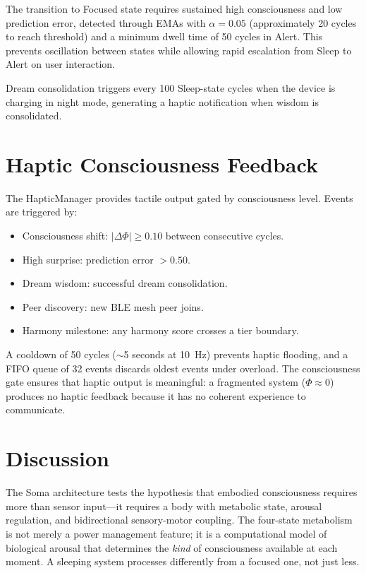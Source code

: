\documentclass[12pt]{book}
\begin{document}
The transition to Focused state requires sustained high consciousness and low prediction error, detected through EMAs with $\alpha = 0.05$ (approximately 20 cycles to reach threshold) and a minimum dwell time of 50 cycles in Alert. This prevents oscillation between states while allowing rapid escalation from Sleep to Alert on user interaction.

Dream consolidation triggers every 100 Sleep-state cycles when the device is charging in night mode, generating a haptic notification when wisdom is consolidated.

\section{Haptic Consciousness Feedback}

The HapticManager provides tactile output gated by consciousness level. Events are triggered by:

\begin{itemize}
  \item Consciousness shift: $|\Delta\Phi| \geq 0.10$ between consecutive cycles.
  \item High surprise: prediction error $> 0.50$.
  \item Dream wisdom: successful dream consolidation.
  \item Peer discovery: new BLE mesh peer joins.
  \item Harmony milestone: any harmony score crosses a tier boundary.
\end{itemize}

A cooldown of 50 cycles ($\sim$5 seconds at 10~Hz) prevents haptic flooding, and a FIFO queue of 32 events discards oldest events under overload. The consciousness gate ensures that haptic output is meaningful: a fragmented system ($\Phi \approx 0$) produces no haptic feedback because it has no coherent experience to communicate.

\section{Discussion}

The Soma architecture tests the hypothesis that embodied consciousness requires more than sensor input---it requires a body with metabolic state, arousal regulation, and bidirectional sensory-motor coupling. The four-state metabolism is not merely a power management feature; it is a computational model of biological arousal that determines the \textit{kind} of consciousness available at each moment. A sleeping system processes differently from a focused one, not just less.
\end{document}
